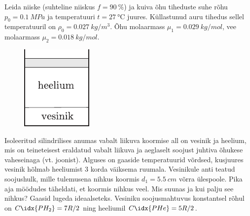 \documentclass[10pt, twoside]{article}
\begin{document}
{%

Leida niiske (suhteline niiskus $f = \SI{90}{\%}$) ja kuiva õhu tiheduste suhe rõhu $p_0 = \SI{0,1}{MPa}$ ja temperatuuri $t = \SI{27}{\degreeCelsius}$ juures. Küllastunud auru tihedus sellel temperatuuril on $\rho_0 = \SI{0,027}{kg/m^3}$. Õhu molaarmass $\mu_1 = \SI{0,029}{kg/mol}$, vee molaarmass $\mu_2 = \SI{0,018}{kg/mol}$.
\probend
\bigskip


\begin{figure}
	\begin{center}
		\vspace{-20pt}
		\includegraphics[width=0.95\linewidth]{2007-v3g-06-yl}
	\end{center}
\end{figure}
Isoleeritud silindrilises anumas vabalt liikuva koormise all on vesinik ja heelium, mis on teineteisest eraldatud vabalt liikuva ja aeglaselt soojust juhtiva õhukese vaheseinaga (vt. joonist). Alguses on gaaside temperatuurid võrdsed, kusjuures vesinik hõlmab heeliumist 3 korda väiksema ruumala. Vesinikule anti teatud soojushulk, mille tulemusena nihkus koormis $d_1 = \SI{5,5}{cm}$ võrra ülespoole. Pika aja möödudes täheldati, et koormis nihkus veel. Mis suunas ja kui palju see nihkus? Gaasid lugeda ideaalseteks. Vesiniku soojusmahtuvus konstantsel rõhul on $C\idx{PH_2} = 7R/2$ ning heeliumil $C\idx{PHe} = 5R/2$.
\probend
\bigskip

}
\end{document}
